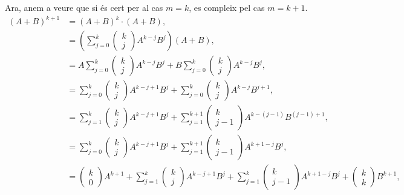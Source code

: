 \begin{exercise}[1.8.9]
\begin{solution}
    Ara, anem a veure que si és cert per al cas $m=k$, es compleix pel cas $m=k+1$.
    \begin{align}
    (A+B)^{k+1} &= (A+B)^k\cdot (A+B),\\
    &= \left(\sum_{j=0}^k \begin{pmatrix} k \\j \end{pmatrix} A^{k-j}B^j\right)(A+B) ,\\
    &=  A\sum_{j=0}^k \begin{pmatrix} k \\j \end{pmatrix} A^{k-j}B^j+ B\sum_{j=0}^k \begin{pmatrix} k \\j \end{pmatrix} A^{k-j}B^{j},\\
    &=  \sum_{j=0}^k \begin{pmatrix} k \\j \end{pmatrix} A^{k-j+1}B^j+\sum_{j=0}^k \begin{pmatrix} k \\j \end{pmatrix} A^{k-j}B^{j+1},\\
    &= \sum_{j=1}^k \begin{pmatrix} k \\j \end{pmatrix} A^{k-j+1}B^j+ \sum_{j=1}^{k+1} \begin{pmatrix} k \\j-1 \end{pmatrix} A^{k-(j-1)}B^{(j-1)+1},\\
    &= \sum_{j=0}^k \begin{pmatrix} k \\j \end{pmatrix} A^{k-j+1}B^j+ \sum_{j=1}^{k+1} \begin{pmatrix} k \\j-1 \end{pmatrix} A^{k+1-j}B^{j},\\
    &= \begin{pmatrix} k \\0 \end{pmatrix}A^{k+1}+ \sum_{j=1}^k \begin{pmatrix} k \\j \end{pmatrix} A^{k-j+1}B^j+ \sum_{j=1}^{k} \begin{pmatrix} k \\j-1 \end{pmatrix} A^{k+1-j}B^{j} +\begin{pmatrix} k \\k \end{pmatrix}B^{k+1} ,\\

\end{align}
\end{solution}
\end{exercise}

